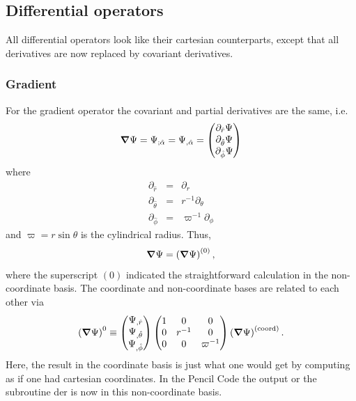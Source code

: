 \documentclass[\mydriver,12pt,twoside,notitlepage,a4paper]{article}
\newcommand{\nab}{\mbox{\boldmath $\nabla$} {}}
\begin{document}
\subsection{Differential operators}

All differential operators look like their cartesian counterparts,
except that all derivatives are now replaced by covariant derivatives.

\subsubsection{Gradient}
\newcommand{\rrrr}{r}
\newcommand{\zzzz}{z}
\newcommand{\ddr}{\partial_{\hat r}}
\newcommand{\ddt}{\partial_{\hat\theta}}
\newcommand{\ddp}{\partial_{\hat\phi}}
\newcommand{\DDr}{{\rm D}_r {}}
\newcommand{\DDDr}{{\cal D}_r {}}
\newcommand{\DDDDr}{{\rm D}^{-1}_r {}}
\newcommand{\DDt}{{\rm D}_\theta {}}
\newcommand{\Ddt}{{\rm D}_\theta^2 {}}
\newcommand{\DDDDt}{{\rm D}^{-1}_\theta {}}
\newcommand{\dDt}{{\cal D}_\theta^2 {}}
\newcommand{\drr}{{\rm d}_r^2 {}}
\newcommand{\dtt}{{\rm d}_\theta^2 {}}
\newcommand{\dpp}{{\rm d}_\phi^2 {}}
\newcommand{\Drr}{{\rm D}_r^2 {}}
\newcommand{\DDrr}{{\cal D}_r^2 {}}

For the gradient operator the covariant and partial derivatives are
the same, i.e.\
\begin{equation}
\nab\Psi={\Psi}_{;{\hat\alpha}}={\Psi}_{,{\hat\alpha}}=
\begin{pmatrix}
\ddr\Psi\cr\ddt\Psi\cr\ddp\Psi
\end{pmatrix}
\end{equation}
where
\begin{eqnarray}
\ddr&=&\partial_r\\
\ddt&=&r^{-1}\partial_\theta\\
\ddp&=&\varpi^{-1}\partial_\phi
\end{eqnarray}
and $\varpi=r\sin\theta$ is the cylindrical radius.
Thus,
\begin{equation}
\nab\Psi=\left(\nab\Psi\right)^{(0)},
\end{equation}
where the superscript $(0)$ indicated the straightforward
calculation in the non-coordinate basis.
The coordinate and non-coordinate bases are related to each other via
\begin{equation}
\left(\nab\Psi\right)^{0}
\equiv
\begin{pmatrix}
\Psi_{,\hat r}\cr\Psi_{,\hat\theta}\cr\Psi_{,\hat\phi}
\end{pmatrix}
\begin{pmatrix}
1 & 0 & 0\cr 0 & r^{-1} & 0 \cr 0 & 0 & \varpi^{-1}
\end{pmatrix}
\left(\nab\Psi\right)^{(\rm coord)}.
\end{equation}
Here, the result in the coordinate basis is just what one would
get by computing as if one had cartesian coordinates.
In the {\sc Pencil Code} the output or the subroutine {\sf der} is
now in this non-coordinate basis.
\end{document}

